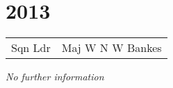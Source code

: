 \chapter*{2013}

\begin{center}
  \small
  \begin{tabular}{rl}
    Sqn Ldr & Maj W N W Bankes \\
  \end{tabular}
\end{center}

\begin{center}
  \textit{No further information}
\end{center}

\vspace{50mm}

\pagebreak
